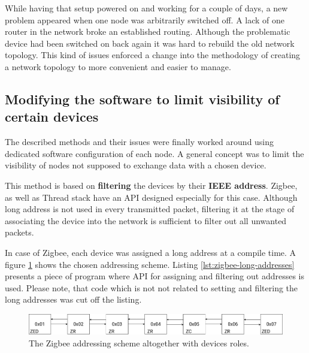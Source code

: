 While having that setup powered on and working for a couple of days, a new 
problem appeared when one node was arbitrarily switched off. A lack of
one router in the network broke an established routing. Although the problematic
device had been switched on back again it was hard to rebuild the old network
topology. This kind of issues enforced a change into the methodology of
creating a network topology to more convenient and easier to manage.

\subsection*{Modifying the software to limit visibility of certain devices}
\label{sec:modifying_visibility}
The described methods and their issues were finally 
worked around using dedicated software configuration of each node. A general 
concept was to limit the visibility of nodes not supposed to exchange data 
with a chosen device.

This method is based on  \textbf{filtering} the devices by their \textbf{IEEE address}.
Zigbee, as well as Thread stack have an API designed especially for this case.
Although long address is not used in every transmitted packet, filtering it
at the stage of associating the device into the network is sufficient to filter
out all unwanted packets.

In case of Zigbee, each device was assigned a long address at a compile time.
A figure \ref{fig:long_address} shows the chosen addressing scheme. Listing 
\ref{lst:zigbee-long-addresses} presents a piece of program where API
for assigning and filtering out addresses is used.  Please note, that
code which  is not not related to setting and filtering the long addresses was cut off the listing.

\begin{figure}[H]
    \centering
    \includegraphics[scale=0.32]{images/zigbee-ieee-address.drawio.png}
    \caption{The Zigbee addressing scheme altogether with devices roles.}
    \label{fig:long_address}
\end{figure}

